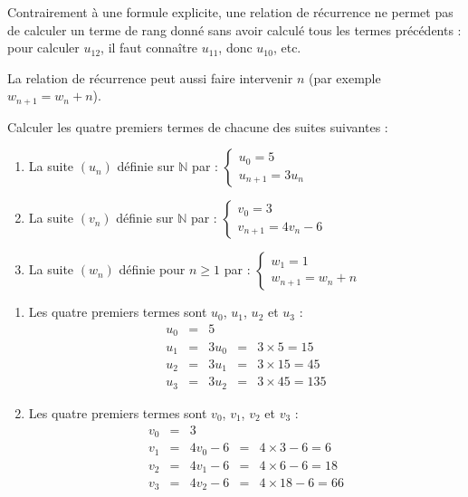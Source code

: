 \begin{rem}
	Contrairement à une formule explicite, une relation de récurrence ne permet pas de calculer un terme de rang donné sans avoir calculé tous les termes précédents : pour calculer $u_{12}$, il faut connaître $u_{11}$, donc $u_{10}$, etc.

	La relation de récurrence peut aussi faire intervenir $n$ (par exemple $w_{n+1} = w_n + n$).
\end{rem}

\newpage

\begin{methode}
	Calculer les quatre premiers termes de chacune des suites suivantes :
	\begin{enumerate}
		\item La suite $(u_n)$ définie sur $\mathbb{N}$ par : $\begin{cases} u_0 = 5 \\ u_{n+1} = 3u_n\end{cases}$
		\item La suite $(v_n)$ définie sur $\mathbb{N}$ par : $\begin{cases} v_0 = 3 \\ v_{n+1} = 4v_n - 6\end{cases}$
		\item La suite $(w_n)$ définie pour $n \geq 1$ par : $\begin{cases} w_1 = 1 \\ w_{n+1} = w_n + n \end{cases}$
	\end{enumerate}

	\begin{correction}
		\nline
		\begin{enumerate}
			\item Les quatre premiers termes sont $u_0$, $u_1$, $u_2$ et $u_3$ :
			      \[
				      \begin{array}{rclcl}
					      u_0 & = & 5    &   &                   \\
					      u_1 & = & 3u_0 & = & 3 \times 5 = 15   \\
					      u_2 & = & 3u_1 & = & 3 \times 15 = 45  \\
					      u_3 & = & 3u_2 & = & 3 \times 45 = 135
				      \end{array}
			      \]

			\item Les quatre premiers termes sont $v_0$, $v_1$, $v_2$ et $v_3$ :
			      \[
				      \begin{array}{rclcl}
					      v_0 & = & 3        &   &                      \\
					      v_1 & = & 4v_0 - 6 & = & 4 \times 3 - 6 = 6   \\
					      v_2 & = & 4v_1 - 6 & = & 4 \times 6 - 6 = 18  \\
					      v_3 & = & 4v_2 - 6 & = & 4 \times 18 - 6 = 66
				      \end{array}
			      \]


\end{enumerate}
\end{correction}
\end{methode}
